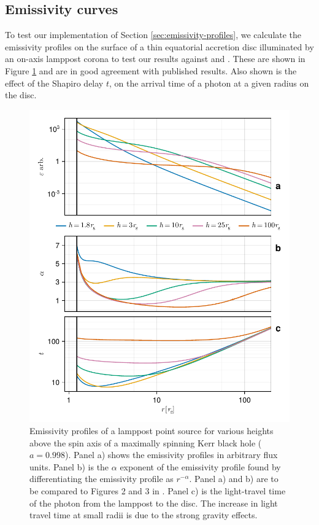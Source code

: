 \documentclass[fleqn,usenatbib]{mnras}
\begin{document}
\subsection{Emissivity curves}

To test our implementation of Section \ref{sec:emissivity-profiles}, we
calculate the emissivity profiles on the surface of a thin equatorial accretion
disc illuminated by an on-axis lamppost corona to test our results against
\cite{wilkins_understanding_2012} and \cite{dauser_irradiation_2013}. These are
shown in Figure \ref{fig:emissivity-profiles} and are in good agreement with
published results. Also shown is the effect of the Shapiro delay $t$, on the
arrival time of a photon at a given radius on the disc.

\begin{figure}
	\centering
	\includegraphics[width=0.99\linewidth]{figures/emissivity.point-source.pdf}
    \caption{Emissivity profiles of a lamppost point source for various heights
        above the spin axis of a maximally spinning Kerr black hole ($a =
        0.998$). Panel a) shows the emissivity profiles in arbitrary flux units.
        Panel b) is the $\alpha$ exponent of the emissivity profile found by
        differentiating the emissivity profile as $r^{-\alpha}$.  Panel a) and
        b) are to be compared to Figures 2 and 3 in
        \citet{dauser_irradiation_2013}. Panel c) is the light-travel time of
        the photon from the lamppost to the disc. The increase in light travel
        time at small radii is due to the strong gravity effects.
}
	\label{fig:emissivity-profiles}
\end{figure}
\end{document}
